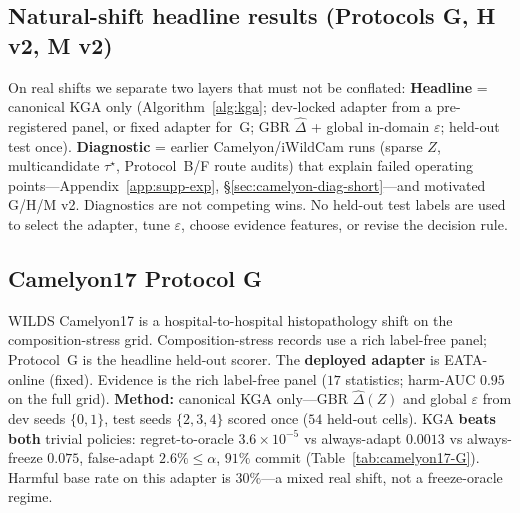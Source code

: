 \documentclass[conference]{IEEEtran}
\theoremstyle{plain}
\theoremstyle{definition}
\theoremstyle{remark}
\begin{document}
\subsection{Natural-shift headline results (Protocols G, H v2, M v2)}\label{sec:nat-shift-headline}
On real shifts we separate two layers that must not be conflated:
\textbf{Headline} = canonical \textsc{KGA} only (Algorithm~\ref{alg:kga}; dev-locked adapter
from a pre-registered panel, or fixed adapter for~G; GBR $\widehat\Delta$ + global
in-domain $\varepsilon$; held-out test once).
\textbf{Diagnostic} = earlier Camelyon/iWildCam runs (sparse $Z$, multicandidate $\tau^\star$,
Protocol~B/F route audits) that explain failed operating points---Appendix~\ref{app:supp-exp},
\S\ref{sec:camelyon-diag-short}---and motivated G/H/M v2. Diagnostics are not competing wins.
No held-out test labels are used to select the adapter, tune $\varepsilon$, choose evidence
features, or revise the decision rule.

\subsection{Camelyon17 Protocol G}
WILDS Camelyon17 is a hospital-to-hospital histopathology shift on the composition-stress
grid. Composition-stress records use a rich label-free panel; Protocol~G is the headline
held-out scorer. The \textbf{deployed adapter}
is EATA-online (fixed). Evidence is the rich label-free panel ($17$ statistics;
harm-AUC $0.95$ on the full grid). \textbf{Method:} canonical \textsc{KGA} only---GBR
$\widehat\Delta(Z)$ and global $\varepsilon$ from dev seeds $\{0,1\}$, test seeds
$\{2,3,4\}$ scored once ($54$ held-out cells). \textsc{KGA} \textbf{beats both}
trivial policies: regret-to-oracle $3.6{\times}10^{-5}$ vs always-adapt $0.0013$ vs always-freeze
$0.075$, false-adapt $2.6\%\le\alpha$, $91\%$ commit (Table~\ref{tab:camelyon17-G}). Harmful
base rate on this adapter is $30\%$---a mixed real shift, not a freeze-oracle regime.

\begin{table}[t]\centering\small
\caption{Camelyon17 Protocol~G: canonical \textsc{KGA}, EATA-online, held-out test ($n{=}54$).}
\label{tab:camelyon17-G}
\end{table}
\end{document}
